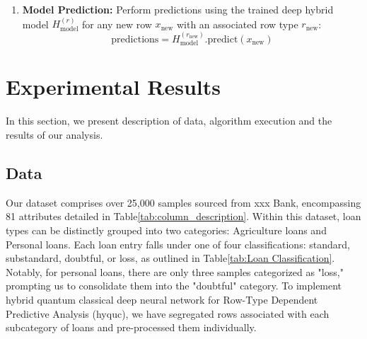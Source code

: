 \documentclass[a4paper]{article}
\begin{document}
\begin{enumerate}[label=\arabic*.]
\item \textbf{Model Prediction:}
	Perform predictions using the trained deep hybrid model $H_{\text{model}}^{(r)}$ for any new row $x_{\text{new}}$ with an associated row type $r_{\text{new}}$:
	\[\text{predictions} = H_{\text{model}}^{(r_{\text{new}})}.\text{predict}(x_{\text{new}}) \]
	\end{enumerate} 

		
\section{Experimental Results}
In this section, we present description of data, algorithm execution and the results of our analysis.\\

\subsection{Data}
 Our dataset comprises over 25,000 samples sourced from xxx Bank, encompassing 81 attributes detailed in Table\ref{tab:column_description}. Within this dataset, loan types can be distinctly grouped into two categories: Agriculture loans and Personal loans. Each loan entry falls under one of four classifications: standard, substandard, doubtful, or loss, as outlined in Table\ref{tab:Loan Classification}. Notably, for personal loans, there are only three samples categorized as "loss," prompting us to consolidate them into the "doubtful" category. To implement hybrid quantum classical deep neural network for Row-Type Dependent Predictive Analysis (\gls{hyquc}), we have segregated rows associated with each subcategory of loans and pre-processed them individually.
 \vspace{1cm}
\end{document}
